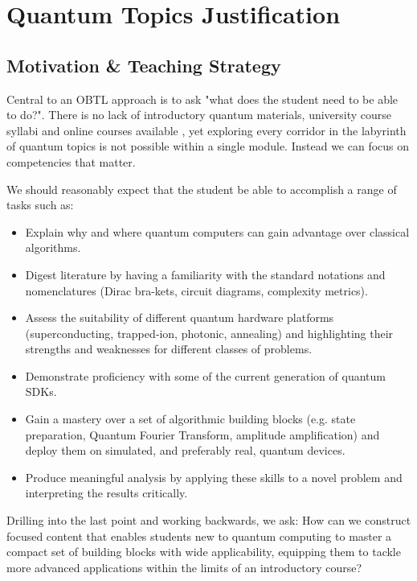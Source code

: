 \section{Quantum Topics Justification}

\subsection{Motivation \& Teaching Strategy}

Central to an OBTL approach is to ask "what does the student need to be able to do?". 
There is no lack of introductory quantum materials, university course syllabi and online courses available \cite{Ekert:2000}\cite{Abhijith:2022}\cite{Lipton:2021},  
yet exploring every corridor in the labyrinth of quantum topics is not possible within a single module.
Instead we can focus on competencies that matter.

We should reasonably expect that the student be able to accomplish a range of tasks such as:
\begin{itemize}
	\item Explain why and where quantum computers can gain advantage over classical algorithms.
	\item Digest literature by having a familiarity with the standard notations and nomenclatures (Dirac bra-kets, circuit diagrams, complexity metrics).
	\item Assess the suitability of different quantum hardware platforms (superconducting, trapped‑ion, photonic, annealing) and highlighting their strengths and weaknesses for different classes of problems.
	\item Demonstrate proficiency with some of the current generation of quantum SDKs.
	\item Gain a mastery over a set of algorithmic building blocks (e.g. state preparation, Quantum Fourier Transform, amplitude amplification) and deploy them on simulated, and preferably real,
	 quantum devices.
	\item Produce meaningful analysis by applying these skills to a novel problem and interpreting the results critically.
\end{itemize}

Drilling into the last point and working backwards, we ask: 
How can we construct focused content that enables students new to quantum computing to master a compact set of 
building blocks with wide applicability, equipping them to tackle more advanced applications
within the limits of an introductory course?

